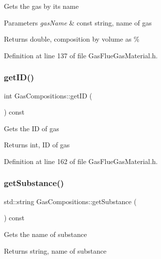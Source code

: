 Gets the gas by its name 
\begin{DoxyParams}{Parameters}
{\em gas\+Name} & const string, name of gas \\
\hline
\end{DoxyParams}
\begin{DoxyReturn}{Returns}
double, composition by volume as \% 
\end{DoxyReturn}


Definition at line 137 of file Gas\+Flue\+Gas\+Material.\+h.

\mbox{\label{class_gas_compositions_a9668decdb2b5065c8ee3c59c207b9d51}} 
\subsubsection{\texorpdfstring{get\+I\+D()}{getID()}}
{\footnotesize\ttfamily int Gas\+Compositions\+::get\+ID (\begin{DoxyParamCaption}{ }\end{DoxyParamCaption}) const\hspace{0.3cm}{\ttfamily [inline]}}

Gets the ID of gas \begin{DoxyReturn}{Returns}
int, ID of gas 
\end{DoxyReturn}


Definition at line 162 of file Gas\+Flue\+Gas\+Material.\+h.

\mbox{\label{class_gas_compositions_abad9554bca9b68cd970eae11bdd3c505}} 
\subsubsection{\texorpdfstring{get\+Substance()}{getSubstance()}}
{\footnotesize\ttfamily std\+::string Gas\+Compositions\+::get\+Substance (\begin{DoxyParamCaption}{ }\end{DoxyParamCaption}) const}

Gets the name of substance \begin{DoxyReturn}{Returns}
string, name of substance 
\end{DoxyReturn}


